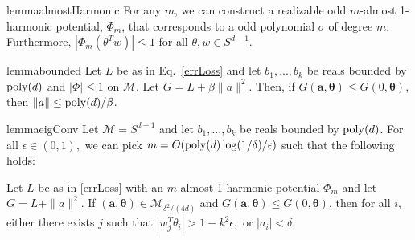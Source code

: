 \documentclass{article}
\begin{document}
\begin{restatable}{lemma}{almostHarmonic}\label{AlmostHarmonic}
For any $m$, we can construct a realizable odd $m$-almost 1-harmonic potential, $\Phi_m$, that corresponds to a odd polynomial $\sigma$ of degree $m$. Furthermore, $|\Phi_m(\theta^Tw)|\leq 1$ for all $\theta, w \in S^{d-1}$.
\end{restatable}
%
%
\begin{restatable}{lemma}{bounded}
\label{bounded}
  Let $L$ be as in Eq.~\eqref{errLoss} and let $b_1,...,b_k$ be reals
  bounded by $\mathrm{poly}(d)$ and $|\Phi|\leq 1$ on $\mathcal{M}$. Let
  $G = L + \beta\|a\|^2$. Then, if
  $G(\boldsymbol{a,\theta}) \leq G(0,\boldsymbol{\theta})$, then
  $\|a\| \leq \mathrm{poly}(d)/\beta$.
\end{restatable}
%
%
\begin{restatable}{lemma}{eigConv}
\label{eigConv}
Let $\mathcal{M} = S^{d-1}$ and let $b_1,...,b_k$ be reals bounded by
$\mathrm{poly}(d)$. For all $\epsilon \in (0,1),$ we can pick
$m = O(\mathrm{poly}(d)\log(1/\delta)/\epsilon)$ such that the following holds:

Let $L$ be as in \eqref{errLoss} with an $m$-almost 1-harmonic
potential $\Phi_m$ and let $G = L + \|a\|^2$.  If
$(\boldsymbol{a,\theta}) \in \mathcal{M}_{\delta^2/(4d)}$ and
$G(\boldsymbol{a,\theta}) \leq G(0,\boldsymbol{\theta})$, then for all
$i$, either there exists $j$ such that
$|w_j^T\theta_i| > 1- k^2\epsilon,$ or $|a_i| < \delta$.
\end{restatable}
%
\end{document}
